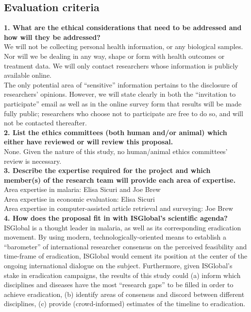 \documentclass{article}
\begin{document}
\subsection*{Evaluation criteria}


\noindent \textbf{1. What are the ethical considerations that need to be addressed and how will they be addressed?} \\
We will not be collecting personal health information, or any biological samples. Nor will we be dealing in any way, shape or form with health outcomes or treatment data.
We will only contact researchers whose information is publicly available online.   \\

\noindent The only potential area of “sensitive” information pertains to the disclosure of researchers’ opinions. However, we will state clearly in both the “invitation to participate” email as well as in the online survey form that results will be made fully public; researchers who choose not to participate are free to do so, and will not be contacted thereafter.  \\


\noindent \textbf{2. List the ethics committees (both human and/or animal) which either have reviewed or will review this proposal.} \\


\noindent None. Given the nature of this study, no human/animal ethics committees’ review is necessary. \\

\noindent \textbf{3. Describe the expertise required for the project and which member(s) of the research team will provide each area of expertise.} \\


\noindent Area expertise in malaria: Elisa Sicuri and Joe Brew \\
\noindent Area expertise in economic evaluation: Elisa Sicuri \\
\noindent Area expertise in computer-assisted article retrieval and surveying: Joe Brew \\


\noindent \textbf{4. How does the proposal fit in with ISGlobal’s scientific agenda?} \\ 


\noindent ISGlobal is a thought leader in malaria, as well as its corresponding eradication movement. By using modern, technologically-oriented means to establish a “barometer” of international researcher consensus on the perceived feasibility and time-frame of eradication, ISGlobal would cement its position at the center of the ongoing international dialogue on the subject. Furthermore, given ISGlobal’s stake in eradication campaigns, the results of this study could (a) inform which disciplines and diseases have the most “research gaps” to be filled in order to achieve eradication, (b) identify areas of consensus and discord between different disciplines, (c) provide (crowd-informed) estimates of the timeline to eradication. \\
\end{document}

